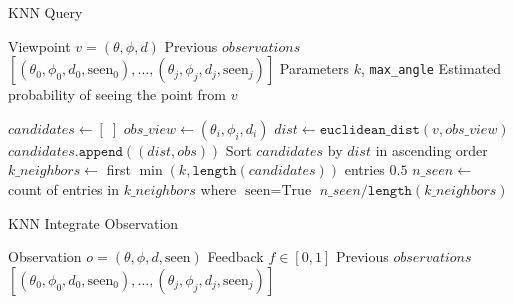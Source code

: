 \begin{singlespace}
  \begin{algorithm}[H]
    \caption{KNN Query}
    \label{alg:knn_query}
    \begin{algorithmic}
      \Require Viewpoint $v = (\theta, \phi, d)$
      \Require Previous $observations$ $[(\theta_0, \phi_0, d_0, \text{seen}_0),\dots,(\theta_j, \phi_j, d_j, \text{seen}_j)]$
      \Require Parameters $k$, \texttt{max\_angle}
      \Ensure Estimated probability of seeing the point from $v$

      \State $candidates \gets [\;]$
      \State $obs\_view \gets (\theta_i, \phi_i, d_i)$
      \State $dist \gets \texttt{euclidean\_dist}(v, obs\_view)$
      \State $candidates.\texttt{append}((dist, obs))$
      \EndIf
      \EndFor
      \State Sort $candidates$ by $dist$ in ascending order
      \State $k\_neighbors \gets$ first $\min(k, \texttt{length}(candidates))$ entries
      \State \Return $0.5$
      \EndIf
      \State $n\_seen \gets$ count of entries in $k\_neighbors$ where $\text{seen} = \text{True}$
      \State \Return $n\_seen / \texttt{length}(k\_neighbors)$
    \end{algorithmic}
  \end{algorithm}
\end{singlespace}

\begin{singlespace}
  \begin{algorithm}[H]
    \caption{KNN Integrate Observation}
    \label{alg:knn_integrate}
    \begin{algorithmic}
      \Require Observation $o = (\theta, \phi, d, \text{seen})$
      \Require Feedback $f \in [0,1]$
      \Require Previous $observations$ $[(\theta_0, \phi_0, d_0, \text{seen}_0),\dots,(\theta_j, \phi_j, d_j, \text{seen}_j)]$
      \Return
      \EndIf
      \State{\Return}
      \EndIf
       
      \Else
      \EndIf
      \State{\Return}
    \end{algorithmic}
  \end{algorithm}
\end{singlespace}

